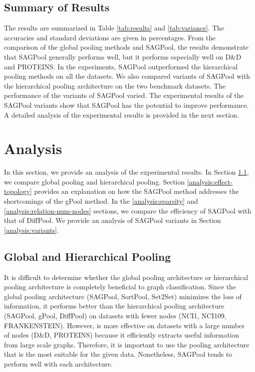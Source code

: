 \documentclass{article}
\begin{document}
\subsection{Summary of Results}
\label{ex:summary}
The results are summarized in Table \ref{tab:results} and \ref{tab:variance}. The accuracies and standard deviations are given in percentages. From the comparison of the global pooling methods and SAGPool, the results demonstrate that SAGPool generally performs well, but it performs especially well on D\&D and PROTEINS. In the experiments, SAGPool outperformed the hierarchical pooling methods on all the datasets. We also compared variants of SAGPool with the hierarchical pooling architecture on the two benchmark datasets. The performance of the variants of SAGPool varied. The experimental results of the SAGPool variants show that SAGPool has the potential to improve performance. A detailed analysis of the experimental results is provided in the next section.




 
\section{Analysis}
\label{analysis}
In this section, we provide an analysis of the experimental results. In Section \ref{analysis:global-hierarhcical}, we compare global pooling and hierarchical pooling. Section \ref{analysis:effect-topology} provides an explanation on how the SAGPool method addresses the shortcomings of the gPool method. In the \ref{analysis:sparsity} and \ref{analysis:relation-num-nodes} sections, we compare the efficiency of SAGPool with that of DiffPool. We provide an analysis of SAGPool variants in Section \ref{analysis:variants}.


\subsection{Global and Hierarchical Pooling}
\label{analysis:global-hierarhcical}
It is difficult to determine whether the global pooling architecture or hierarchical pooling architecture is completely beneficial to graph classification. Since the global pooling architecture  (SAGPool, SortPool, Set2Set) minimizes the loss of information, it  performs better than the hierarchical pooling architecture  (SAGPool, gPool, DiffPool) on datasets with fewer nodes (NCI1, NCI109, FRANKENSTEIN).  However,  is more effective on datasets with a large number of nodes (D\&D, PROTEINS) because it efficiently extracts useful information from large scale graphs. Therefore, it is important to use the  pooling architecture that is the most suitable for the given data. Nonetheless, SAGPool tends to perform well with each architecture.
\end{document}

